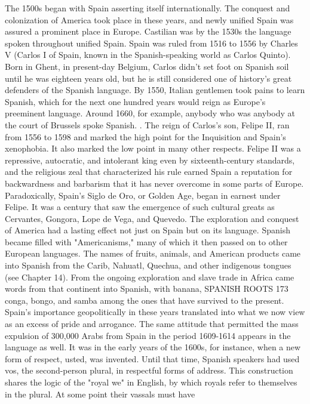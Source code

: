 \documentclass[14pt,a4paper,oneside]{memoir}
\begin{document}
{{{{%
The 1500s began with Spain asserting itself internationally.
The conquest and colonization of America took place in these years,
and newly unified Spain was assured a prominent place in Europe.
Castilian was by the 1530s the language spoken throughout unified
Spain. Spain was ruled from 1516 to 1556 by Charles V (Carlos I of
Spain, known in the Spanish-speaking world as Carlos Quinto). Born
in Ghent, in present-day Belgium, Carlos didn't set foot on Spanish
soil until he was eighteen years old, but he is still considered one of
history's great defenders of the Spanish language. By 1550, Italian gentlemen took pains to learn Spanish, which for the next one hundred
years would reign as Europe's preeminent language. Around 1660, for
example, anybody who was anybody at the court of Brussels spoke
Spanish. .
The reign of Carlos's son, Felipe II, ran from 1556 to 1598 and
marked the high point for the Inquisition and Spain's xenophobia. It
also marked the low point in many other respects. Felipe II was a repressive, autocratic, and intolerant king even by sixteenth-century
standards, and the religious zeal that characterized his rule earned
Spain a reputation for backwardness and barbarism that it has never
overcome in some parts of Europe. Paradoxically, Spain's Siglo de Oro,
or Golden Age, began in earnest under Felipe. It was a century that saw
the emergence of such cultural greats as Cervantes, Gongora, Lope de
Vega, and Quevedo.
The exploration and conquest of America had a lasting effect
not just on Spain but on its language. Spanish became filled with
"Americanisms," many of which it then passed on to other European
languages. The names of fruits, animals, and American products came
into Spanish from the Carib, Nahuatl, Quechua, and other indigenous
tongues (see Chapter 14). From the ongoing exploration and slave trade
in Africa came words from that continent into Spanish, with banana,
SPANISH ROOTS 173
conga, bongo, and samba among the ones that have survived to the
present.
Spain's importance geopolitically in these years translated into
what we now view as an excess of pride and arrogance. The same attitude that permitted the mass expulsion of 300,000 Arabs from Spain
in the period 1609-1614 appears in the language as well. It was in
the early years of the 1600s, for instance, when a new form of respect,
usted, was invented. Until that time, Spanish speakers had used vos,
the second-person plural, in respectful forms of address. This construction shares the logic of the "royal we" in English, by which royals refer to themselves in the plural. At some point their vassals must have
}}}}
\end{document}
